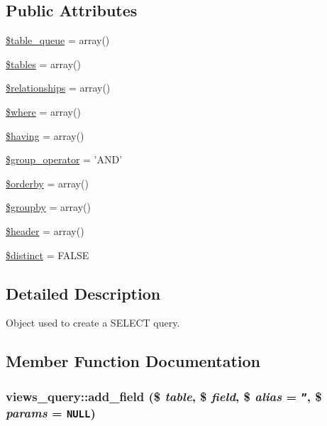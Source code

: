 \subsection*{Public Attributes}
\begin{CompactItemize}
\item 
\hyperlink{classviews__query_209ff1ef3916cfbdfc70560e567a9cc0}{\$table\_\-queue} = array()
\item 
\hyperlink{classviews__query_cec1482297b871cac1fddcef0a0e8ab1}{\$tables} = array()
\item 
\hyperlink{classviews__query_deed5f6f13a7d105ada7c1329c3169d6}{\$relationships} = array()
\item 
\hyperlink{classviews__query_2654e7db457f1b7ec34ca1ac3345fc83}{\$where} = array()
\item 
\hyperlink{classviews__query_a63f09e8b8810660bbc0c480f763c8a7}{\$having} = array()
\item 
\hyperlink{classviews__query_a290c68d4f2fd7ccc73219ce5e57d0f7}{\$group\_\-operator} = 'AND'
\item 
\hyperlink{classviews__query_03a5999bf0fcd2bd5a51dfea6c78ebdb}{\$orderby} = array()
\item 
\hyperlink{classviews__query_9e680695793121eceb7da5e5f8f0105a}{\$groupby} = array()
\item 
\hyperlink{classviews__query_8c8dc5000b07e8a5ade3691ddabecbc3}{\$header} = array()
\item 
\hyperlink{classviews__query_48c0f8c68da79257d96109835021305c}{\$distinct} = FALSE
\end{CompactItemize}


\subsection{Detailed Description}
Object used to create a SELECT query. 

\subsection{Member Function Documentation}
\hypertarget{classviews__query_7d073b7dde56cfb8c0e97696b50d5da4}{
\subsubsection[{add\_\-field}]{\setlength{\rightskip}{0pt plus 5cm}views\_\-query::add\_\-field (\$ {\em table}, \/  \$ {\em field}, \/  \$ {\em alias} = {\tt ''}, \/  \$ {\em params} = {\tt NULL})}}
\label{classviews__query_7d073b7dde56cfb8c0e97696b50d5da4}


